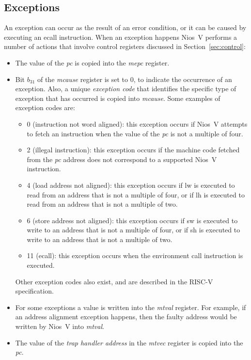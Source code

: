 \documentclass[11pt, twoside, pdftex]{article}
\begin{document}
\subsection{Exceptions}
\label{sec:exceptions}
An exception can occur as the result of an error condition, or it can be caused by
executing an {\sf ecall} instruction. When an exception happens Nios~V performs a number
of actions that involve control registers discussed in Section~\ref{sec:control}:
\vspace{-\baselineskip}
\begin{itemize}
\item The value of the {\it pc} is copied into the {\it mepc} register. 
\item Bit $b_{31}$ of the {\it mcause} register is set to 0, to indicate the occurrence of an
exception. Also, a unique {\it exception code} that identifies the specific type of exception that
has occurred is copied into {\it mcause}. Some examples of exception codes are: 
\begin{itemize}
\item 0 (instruction not word aligned): this exception occurs if Nios~V attempts to fetch
an instruction when the value of the {\it pc} is not a multiple of four.
\item 2 (illegal instruction): this exception occurs if the machine code fetched from the
{\it pc} address does not correspond to a supported Nios~V instruction.
\item 4 (load address not aligned): this exception occurs if {\sf lw} is executed
to read from an address that is not a multiple of four, or if {\sf lh} is executed to read
from an address that is not a multiple of two.
\item 6 (store address not aligned): this exception occurs if {\sf sw} is executed
to write to an address that is not a multiple of four, or if {\sf sh} is executed to write
to an address that is not a multiple of two.
\item 11 (ecall): this exception occurs when the environment
call instruction is executed.
\end{itemize}

Other exception codes also exist, and are described in the RISC-V specification.

\item For some exceptions a value is written into the {\it mtval} register. For example,
if an address alignment exception happens, then the faulty address would be written by
Nios~V into {\it mtval}.
\item The value of the {\it trap handler address} in the {\it mtvec} register is copied 
into the {\it pc}.
\end{itemize}
\end{document}
